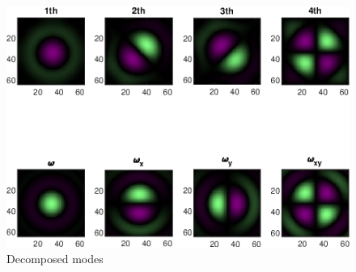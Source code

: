 \documentclass{article}
\numberwithin{equation}{section}
\begin{document}
\begin{enumerate}[leftmargin=*]
\begin{figure}[H]
\centering

\includegraphics[width=0.9\linewidth]{../figures/gradients.eps} 
\caption{Decomposed modes} 
 \end{figure}
 

\end{enumerate}
\end{document}
